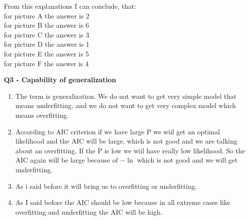 \documentclass[12pt,a4paper]{article}
\begin{document}
From this explanations I can conclude, that:\\
for picture A the answer is 2\\
for picture B the answer is 6\\
for picture C the answer is 3\\
for picture D the answer is 1\\
for picture E the answer is 5\\
for picture F the answer is 4\\
\newpage
\begin{center}
	\textbf{Q3 - Capability of generalization}
\end{center}
\begin{enumerate}[label=(\alph*)]
\item The term is generalization. We do not want to get very simple model that means underfitting, and we do not want to get very complex model which means overfitting. 
\item According to AIC criterion if we have large P we wiil get an optimal likelihood and the AIC will be large, which is not good and we are talking about an overfitting. If the P is low we wiil have really low likelihood. So the AIC again will be large because of $-\ln$ which is not good and we will get underfitting.
\item As i said before it will bring us to overfitting or underfitting.
\item As I said before the AIC should be low because in all extreme cases like overfitting and underfitting the AIC will be high.

\end{enumerate}
\newpage


\end{document}
